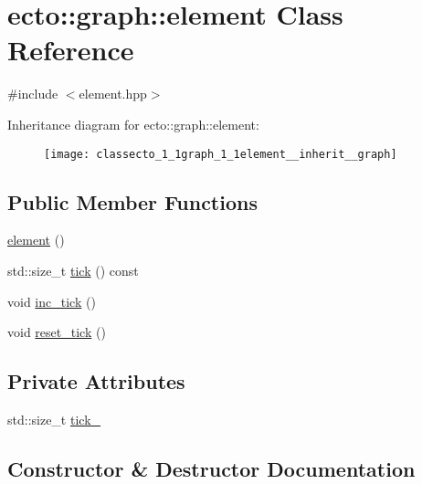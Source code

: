\hypertarget{classecto_1_1graph_1_1element}{}\section{ecto\+:\+:graph\+:\+:element Class Reference}
\label{classecto_1_1graph_1_1element}


{\ttfamily \#include $<$element.\+hpp$>$}



Inheritance diagram for ecto\+:\+:graph\+:\+:element\+:\nopagebreak
\begin{figure}[H]
\begin{center}
\leavevmode
\texttt{[image: classecto\_1\_1graph\_1\_1element\_\_inherit\_\_graph]}
\end{center}
\end{figure}
\subsection*{Public Member Functions}
\begin{DoxyCompactItemize}
\item 
\hyperlink{classecto_1_1graph_1_1element_abf5d2137a1fd29f25af2b8f6bd0397df}{element} ()
\item 
std\+::size\+\_\+t \hyperlink{classecto_1_1graph_1_1element_a966b0c7cd87bdc5c5787d9b110966d8f}{tick} () const 
\item 
void \hyperlink{classecto_1_1graph_1_1element_a5d5b283bacb5371285e27c0f42e54985}{inc\+\_\+tick} ()
\item 
void \hyperlink{classecto_1_1graph_1_1element_a6417601ffd8159b6e00f2ff57eda1b99}{reset\+\_\+tick} ()
\end{DoxyCompactItemize}
\subsection*{Private Attributes}
\begin{DoxyCompactItemize}
\item 
std\+::size\+\_\+t \hyperlink{classecto_1_1graph_1_1element_a6f850cead9edb37941344fdbd40ae112}{tick\+\_\+}
\end{DoxyCompactItemize}


\subsection{Constructor \& Destructor Documentation}
